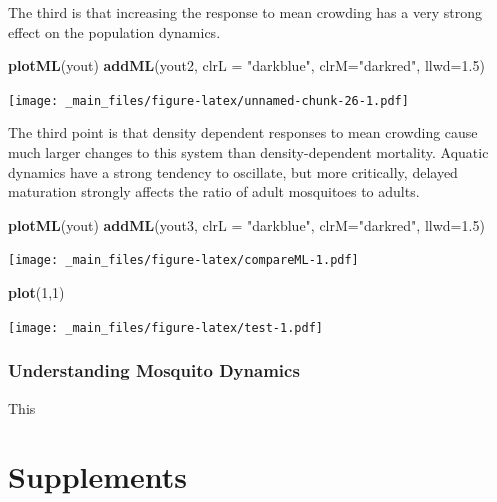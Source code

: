 \documentclass[
]{book}
\newenvironment{Shaded}{\begin{snugshade}}{\end{snugshade}}
\newcommand{\AttributeTok}[1]{\textcolor[rgb]{0.13,0.29,0.53}{#1}}
\newcommand{\DecValTok}[1]{\textcolor[rgb]{0.00,0.00,0.81}{#1}}
\newcommand{\FloatTok}[1]{\textcolor[rgb]{0.00,0.00,0.81}{#1}}
\newcommand{\FunctionTok}[1]{\textcolor[rgb]{0.13,0.29,0.53}{\textbf{#1}}}
\newcommand{\NormalTok}[1]{#1}
\newcommand{\StringTok}[1]{\textcolor[rgb]{0.31,0.60,0.02}{#1}}
\begin{document}
The third is that increasing the response to mean crowding has a very strong effect on the population dynamics.

\begin{Shaded}
\begin{Highlighting}[]
\FunctionTok{plotML}\NormalTok{(yout)}
\FunctionTok{addML}\NormalTok{(yout2, }\AttributeTok{clrL =} \StringTok{"darkblue"}\NormalTok{, }\AttributeTok{clrM=}\StringTok{"darkred"}\NormalTok{, }\AttributeTok{llwd=}\FloatTok{1.5}\NormalTok{)}
\end{Highlighting}
\end{Shaded}

\texttt{[image: \_main\_files/figure-latex/unnamed-chunk-26-1.pdf]}

The third point is that density dependent responses to mean crowding cause much larger changes to this system than density-dependent mortality. Aquatic dynamics have a strong tendency to oscillate, but more critically, delayed maturation strongly affects the ratio of adult mosquitoes to adults.

\begin{Shaded}
\begin{Highlighting}[]
\FunctionTok{plotML}\NormalTok{(yout)}
\FunctionTok{addML}\NormalTok{(yout3, }\AttributeTok{clrL =} \StringTok{"darkblue"}\NormalTok{, }\AttributeTok{clrM=}\StringTok{"darkred"}\NormalTok{, }\AttributeTok{llwd=}\FloatTok{1.5}\NormalTok{)}
\end{Highlighting}
\end{Shaded}

\texttt{[image: \_main\_files/figure-latex/compareML-1.pdf]}

\begin{Shaded}
\begin{Highlighting}[]
\FunctionTok{plot}\NormalTok{(}\DecValTok{1}\NormalTok{,}\DecValTok{1}\NormalTok{)}
\end{Highlighting}
\end{Shaded}

\texttt{[image: \_main\_files/figure-latex/test-1.pdf]}

\hypertarget{understanding-mosquito-dynamics}{%
\section{Understanding Mosquito Dynamics}\label{understanding-mosquito-dynamics}}

This

\hypertarget{part-supplements}{%
\part{Supplements}\label{part-supplements}}
\end{document}
